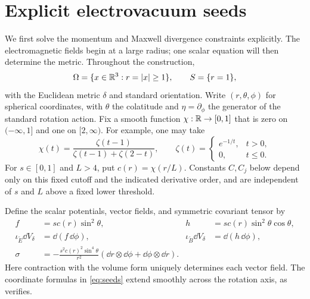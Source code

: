 \section{Explicit electrovacuum seeds}
\label{sec:construction}

We first solve the momentum and Maxwell divergence constraints explicitly.
The electromagnetic fields begin at a large radius; one scalar equation will
then determine the metric.  Throughout the construction,
\[
 \Omega=\{x\in\mathbb R^3:r=|x|\ge1\},\qquad S=\{r=1\},
\]
with the Euclidean metric $\delta$ and standard orientation.  Write
$(r,\theta,\phi)$ for spherical coordinates, with $\theta$ the colatitude and
$\eta=\partial_\phi$ the generator of the standard rotation action.
Fix a smooth function $\chi:\mathbb R\to[0,1]$ that is zero on $(-\infty,1]$ and
one on $[2,\infty)$.  For example, one may take
\[
 \chi(t)=\frac{\zeta(t-1)}{\zeta(t-1)+\zeta(2-t)},\qquad
 \zeta(t)=\begin{cases}e^{-1/t},&t>0,\\0,&t\le0.\end{cases}
\]
For $s\in[0,1]$ and $L>4$, put $c(r)=\chi(r/L)$.  Constants $C,C_j$ below
depend only on this fixed cutoff and the indicated derivative order, and
are independent of $s$ and $L$ above a fixed lower threshold.

Define the scalar potentials, vector fields, and symmetric covariant tensor
by
\begin{equation}
\label{eq:seeds}
\begin{aligned}
 f&=sc(r)\sin^2\theta,& h&=sc(r)\sin^2\theta\cos\theta,\\
 \iota_{\widetilde E}\dd V_\delta&=\dd(f\,\dd\phi),&
 \iota_{\widetilde B}\dd V_\delta&=\dd(h\,\dd\phi),\\
 \sigma&=-\frac{s^2c(r)^2\sin^4\theta}{r^2}
       (\dd r\otimes\dd\phi+\dd\phi\otimes\dd r).
\end{aligned}
\end{equation}
Here contraction with the volume form uniquely determines each vector
field.  The coordinate formulas in \eqref{eq:seeds} extend smoothly across
the rotation axis, as  verifies.

